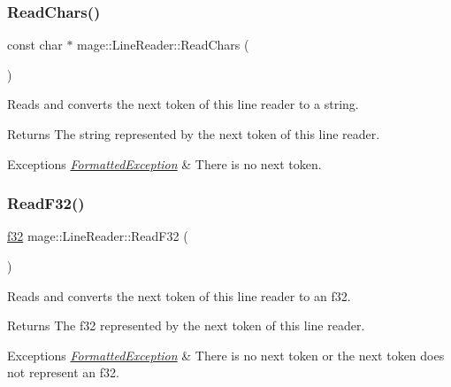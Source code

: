 \subsubsection{\texorpdfstring{Read\+Chars()}{ReadChars()}}
{\footnotesize\ttfamily const char $\ast$ mage\+::\+Line\+Reader\+::\+Read\+Chars (\begin{DoxyParamCaption}{ }\end{DoxyParamCaption})\hspace{0.3cm}{\ttfamily [protected]}}

Reads and converts the next token of this line reader to a string.

\begin{DoxyReturn}{Returns}
The string represented by the next token of this line reader. 
\end{DoxyReturn}

\begin{DoxyExceptions}{Exceptions}
{\em \hyperlink{structmage_1_1_formatted_exception}{Formatted\+Exception}} & There is no next token. \\
\hline
\end{DoxyExceptions}
\hypertarget{classmage_1_1_line_reader_a66b8417d2b2fd3c95579c814caa5de04}{}\label{classmage_1_1_line_reader_a66b8417d2b2fd3c95579c814caa5de04} 
\subsubsection{\texorpdfstring{Read\+F32()}{ReadF32()}}
{\footnotesize\ttfamily \hyperlink{namespacemage_a6a44ad388483959dc4dff9f2aef91431}{f32} mage\+::\+Line\+Reader\+::\+Read\+F32 (\begin{DoxyParamCaption}{ }\end{DoxyParamCaption})\hspace{0.3cm}{\ttfamily [protected]}}

Reads and converts the next token of this line reader to an {\ttfamily f32}.

\begin{DoxyReturn}{Returns}
The {\ttfamily f32} represented by the next token of this line reader. 
\end{DoxyReturn}

\begin{DoxyExceptions}{Exceptions}
{\em \hyperlink{structmage_1_1_formatted_exception}{Formatted\+Exception}} & There is no next token or the next token does not represent an {\ttfamily f32}. \\
\hline
\end{DoxyExceptions}
\hypertarget{classmage_1_1_line_reader_a9c020285175b2771d7106d2354aa1974}{}\label{classmage_1_1_line_reader_a9c020285175b2771d7106d2354aa1974} 
